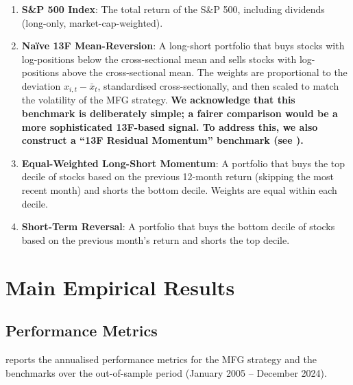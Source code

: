 \begin{enumerate}
    \item \textbf{S\&P 500 Index}: The total return of the S\&P 500, including
    dividends (long-only, market-cap-weighted).
    \item \textbf{Na\"ive 13F Mean-Reversion}: A long-short portfolio that buys
    stocks with log-positions below the cross-sectional mean and sells stocks with
    log-positions above the cross-sectional mean. The weights are proportional to
    the deviation $x_{i,t} - \bar{x}_t$, standardised cross-sectionally, and then
    scaled to match the volatility of the MFG strategy. \textbf{We acknowledge that
    this benchmark is deliberately simple; a fairer comparison would be a more
    sophisticated 13F-based signal. To address this, we also construct a ``13F
    Residual Momentum'' benchmark (see ).}
    \item \textbf{Equal-Weighted Long-Short Momentum}: A portfolio that buys the
    top decile of stocks based on the previous 12-month return (skipping the most
    recent month) and shorts the bottom decile. Weights are equal within each
    decile.
    \item \textbf{Short-Term Reversal}: A portfolio that buys the bottom decile of
    stocks based on the previous month's return and shorts the top decile.
\end{enumerate}


\section{Main Empirical Results}
\label{sec:emp-results}

\subsection{Performance Metrics}

 reports the annualised performance metrics for the
MFG strategy and the benchmarks over the out-of-sample period (January 2005 --
December 2024).

